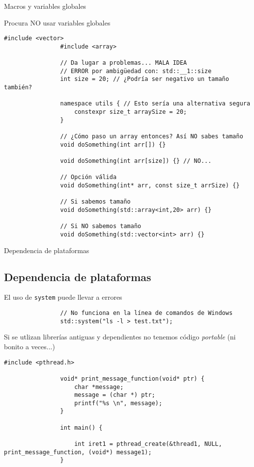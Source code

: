 \documentclass{beamer}
\newcommand{\normalSizeItem}[1] {
  \normalsize{\item #1}
}
\newcommand{\smallCite}[1]{
	\begin{small}
		\cite{#1}	
	\end{small}
}
\begin{document}
		\begin{frame}[fragile]{Macros y variables globales}	
			\begin{itemize}
			
				\normalSizeItem{Procura NO usar variables globales}
				\begin{lstlisting}[basicstyle={\tiny\ttfamily}]
				#include <vector>
				#include <array>
				
				// Da lugar a problemas... MALA IDEA
				// ERROR por ambigüedad con: std::__1::size
				int size = 20; // ¿Podría ser negativo un tamaño también?
				
				namespace utils { // Esto sería una alternativa segura
					constexpr size_t arraySize = 20;
				}
				
				// ¿Cómo paso un array entonces? Así NO sabes tamaño
				void doSomething(int arr[]) {}
				
				void doSomething(int arr[size]) {} // NO...
				
				// Opción válida
				void doSomething(int* arr, const size_t arrSize) {}
				
				// Si sabemos tamaño
				void doSomething(std::array<int,20> arr) {}
				
				// Si NO sabemos tamaño
				void doSomething(std::vector<int> arr) {}
				\end{lstlisting}
				
			\end{itemize}
		\end{frame}
		
		\begin{frame}[fragile]{Dependencia de plataformas}	
			\subsection{Dependencia de plataformas}		
			\begin{itemize}

				\normalSizeItem { El uso de \texttt{system} puede llevar a errores}
				\begin{lstlisting}
				// No funciona en la línea de comandos de Windows
				std::system("ls -l > test.txt");
				\end{lstlisting}
				
				\normalSizeItem { Si se utlizan librerías antiguas y dependientes no tenemos código \textit{portable} (ni bonito a veces...) \smallCite{posixThreads}}
				\begin{lstlisting}[basicstyle={\tiny\ttfamily}]
				#include <pthread.h>

				void* print_message_function(void* ptr) {
					char *message;
					message = (char *) ptr;
					printf("%s \n", message);
				}
				
				int main() {
			
					int iret1 = pthread_create(&thread1, NULL, print_message_function, (void*) message1);
				}

				\end{lstlisting}
				
			\end{itemize}
		\end{frame}
		
\end{document}

